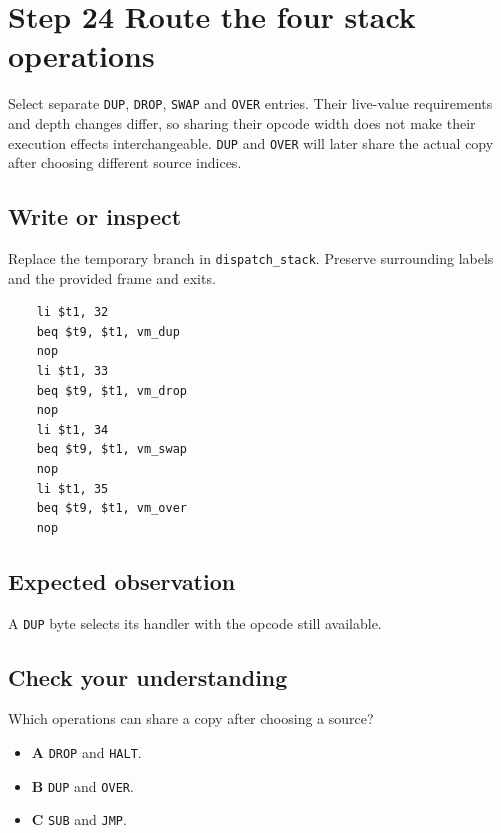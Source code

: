 \section{Step 24 Route the four stack operations}\label{vm-s24}

Select separate \texttt{DUP}, \texttt{DROP}, \texttt{SWAP} and \texttt{OVER} entries. Their live-value requirements and depth changes differ, so sharing their opcode width does not make their execution effects interchangeable. \texttt{DUP} and \texttt{OVER} will later share the actual copy after choosing different source indices.

\subsection{Write or inspect}
Replace the temporary branch in \texttt{dispatch\_stack}. Preserve surrounding labels and the provided frame and exits.

\begin{verbatim}
    li $t1, 32
    beq $t9, $t1, vm_dup
    nop
    li $t1, 33
    beq $t9, $t1, vm_drop
    nop
    li $t1, 34
    beq $t9, $t1, vm_swap
    nop
    li $t1, 35
    beq $t9, $t1, vm_over
    nop
\end{verbatim}
\subsection{Expected observation}
A \texttt{DUP} byte selects its handler with the opcode still available.

\subsection{Check your understanding}
Which operations can share a copy after choosing a source?

\begin{itemize}
  \item \textbf{A} \texttt{DROP} and \texttt{HALT}.
  \item \textbf{B} \texttt{DUP} and \texttt{OVER}.
  \item \textbf{C} \texttt{SUB} and \texttt{JMP}.
\end{itemize}
